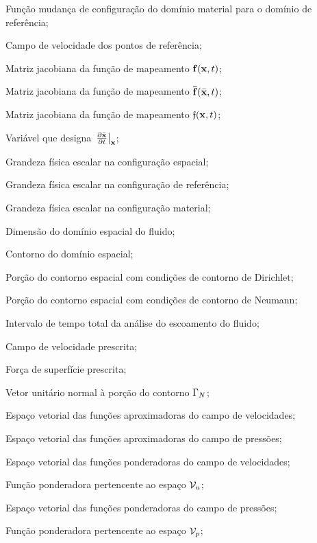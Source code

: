\begin{simbolos}
\item[$\fmapRI(\posMat,t)$] Função mudança de configuração do domínio material para o domínio de referência;	
\item[$\velocityALE$] Campo de velocidade dos pontos de referência;
\item[$\FmapAI$] Matriz jacobiana da função de mapeamento $\mathbf{f}(\mathbf{x},t)$;
\item[$\FmapAR$] Matriz jacobiana da função de mapeamento $\mathbf{\bar{f}}(\bar{\mathbf{x}},t)$;
\item[$\FmapRI$] Matriz jacobiana da função de mapeamento $\fmapRI(\posMat,t)$;
\item[$\mathbf{w}$] Variável que designa $\left. \frac{\partial \bar{\mathbf{x}}}{\partial t} \right|_{\mathbf{x}}$;
\item[$g$] Grandeza física escalar na configuração espacial;
\item[$g^{*}$] Grandeza física escalar na configuração de referência;
\item[$g^{**}$] Grandeza física escalar na configuração material;
\item[$\nsd$] Dimensão do domínio espacial do fluido;
\item[$\boundary$] Contorno do domínio espacial;
\item[$\boundaryD$] Porção do contorno espacial com condições de contorno de Dirichlet;
\item[$\boundaryN$] Porção do contorno espacial com condições de contorno de Neumann;
\item[$\totalTime$] Intervalo de tempo total da análise do escoamento do fluido;
\item[$\velocityD$] Campo de velocidade prescrita;
\item[$\surfaceLoad$] Força de superfície prescrita;
\item[$\snormal$] Vetor unitário normal à porção do contorno $\boundaryN$;
\item[$\usolution$] Espaço vetorial das funções aproximadoras do campo de velocidades;
\item[$\psolution$] Espaço vetorial das funções aproximadoras do campo de pressões;
 \item[$\uweighting$] Espaço vetorial das funções ponderadoras do campo de velocidades;
\item[$\utest$] Função ponderadora pertencente ao espaço $\uweighting$;
\item[$\pweighting$] Espaço vetorial das funções ponderadoras do campo de pressões;
\item[$\ptest$] Função ponderadora pertencente ao espaço $\pweighting$;

\end{simbolos}
